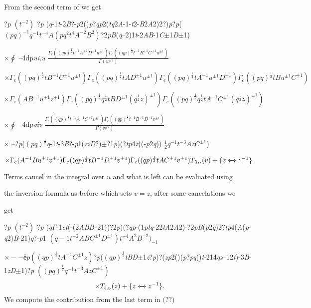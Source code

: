 \documentclass[a4paper,12pt]{article}
\begin{document}
From the second term of we get

?{\it p} $(t^{-2})$ ?{\it p} ({\it q}-1{\it t}-2{\it B}?-{\it p}2(){\it p}?{\it qp}2({\it tq}2{\it A}-1-{\it t}2-{\it B}2{\it A}2)2?){\it p}?{\it p}( $(pq)^{-1}q^{-1}t^{-4}A(pq^{2}t^{4}A^{-2}B^{2})$?2{\it pB}({\it q}--2)1{\it t}-2{\it AB}-1{\it C}$\pm$1{\it D}$\pm$1)

$\displaystyle \times\oint$ --4dp{\it ui.u} $\displaystyle \frac{\Gamma_{e}((qp)^{\frac{1}{2}}t^{-1}A^{\pm 1}D^{\pm 1}u^{\pm 1})\Gamma_{e}((qp)^{\frac{1}{2}}t^{-1}B^{\pm 1}C^{\pm 1}u^{\pm 1})}{\Gamma(u^{\pm 2})}$

$\times\Gamma_{e}((pq)^{\frac{1}{2}}tB^{-1}C^{\pm 1}u^{\pm 1})\Gamma_{e}((pq)^{\frac{1}{2}}tAD^{\pm 1}u^{\pm 1})\Gamma_{e}((pq)^{\frac{1}{2}}tA^{-1}u^{\pm 1}D^{\pm 1})\Gamma_{e}((pq)^{\frac{1}{2}}tBu^{\pm 1}C^{\pm 1})$

$\times\Gamma_{e}(AB^{-1}u^{\pm 1}z^{\pm 1})\Gamma_{e}((pq)^{\frac{1}{2}}q^{\frac{1}{2}}tBD^{\pm 1}(q^{\frac{1}{2}}z)^{\pm 1})\Gamma_{e}((pq)^{\frac{1}{2}}q^{\frac{1}{2}}tA^{-1}C^{\pm 1}(q^{\frac{1}{2}}z)^{\pm 1})$

$\displaystyle \times\oint$ --4dp{\it viv} $\displaystyle \frac{\Gamma_{e}((qp)^{\frac{1}{2}}t^{-1}A^{\pm 1}C^{\pm 1}v^{\pm 1})\Gamma_{e}((qp)^{\frac{1}{2}}t^{-1}B^{\pm 1}D^{\pm 1}v^{\pm 1})}{\Gamma(v^{\pm 2})}$

$\times$ --?{\it p}($(pq)^{\frac{1}{2}}${\it q}-1{\it t}-3{\it B}?-{\it p}1({\it zzD}2)$\pm$?1{\it p})(?{\it tp}4{\it z}((-{\it p}2{\it q})) $\displaystyle \frac{1}{2}q^{-1}t^{-3}AzC^{\pm 1}$)

$\times\Gamma_{e}(A^{-1}Bu^{\pm 1}v^{\pm 1})\Gamma_{e}((qp)^{\frac{1}{2}}tB^{-1}D^{\pm 1}v^{\pm 1})\Gamma_{e}((qp)^{\frac{1}{2}}tAC^{\pm 1}v^{\pm 1})T_{\mathfrak{J}_{D}}(v)+\{z\xleftrightarrow{}z^{-1}\}.$

Terms cancel in the integral over $u$ and what is left can be evaluated using

the inversion formula as before which sets $v=z$, after some cancelations we

get

?{\it p} $(t^{-2})$ ?{\it p} ({\it q}$\Gamma$-1{\it et}(-(2{\it ABB}--21))?2{\it p})$($?{\it qp}-(1{\it ptq}-22{\it tA}2{\it A}2)-?2{\it pB}({\it p}2{\it q})2?{\it tp}4({\it A}({\it p-q}2){\it B}-21){\it q}?-{\it p}1 $(q-1t^{-2}ABC^{\pm 1}D^{\pm 1})t^{-4}A^{2}B^{-2})_{-1}$

$\times--ё p ((qp)^{\frac{1}{2}}tA^{-1}C^{\pm 1}z)$?{\it p}($(qp)^{\frac{1}{2}}${\it tBD}$\pm$1{\it z}?{\it p})?({\it zp}2()({\it p}?{\it pq}(){\it t}-214{\it qz}--12{\it t})-3{\it B}-1{\it zD}$\pm$1)?{\it p} $((pq)^{\frac{1}{2}}q^{-1}t^{-3}AzC^{\pm 1})$
$$
\times T_{\mathrm{J}_{D}}(z)+\{z\xleftrightarrow{}z^{-1}\}.
$$
We compute the contribution from the last term in $($??$)$
\end{document}
